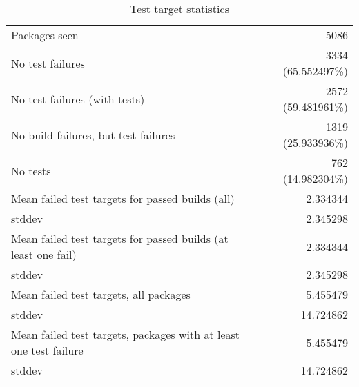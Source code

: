\begin{table}[ht]
\caption{Test target statistics}
\label{table:test}
\begin{tabular}{|l|r|}
 \hline
  Packages seen & 5086 \\
  No test failures & 3334 (65.552497\%) \\
  No test failures (with tests) & 2572 (59.481961\%) \\
  No build failures, but test failures & 1319 (25.933936\%) \\
  No tests & 762 (14.982304\%) \\
 \hline
  Mean failed test targets for passed builds (all) & 2.334344 \\
  stddev & 2.345298 \\
 \hline
  Mean failed test targets for passed builds (at least one fail) & 2.334344 \\
  stddev & 2.345298 \\
 \hline
  Mean failed test targets, all packages& 5.455479 \\
  stddev & 14.724862 \\
 \hline
  Mean failed test targets, packages with at least one test failure& 5.455479 \\
  stddev & 14.724862 \\
 \hline
\end{tabular}
\end{table}


